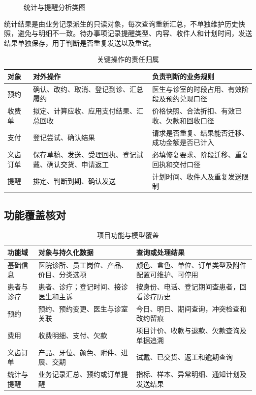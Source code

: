 \begin{figure}[H]\centering
{}
\caption{统计与提醒分析类图}\label{fig:analysis-statistics}
\end{figure}

统计结果是由业务记录派生的只读对象，每次查询重新汇总，不单独维护历史快照，避免与明细不一致。待办事项记录提醒类型、内容、收件人和计划时间，发送结果单独保存，用于判断是否重复发送以及重试。

\begin{table}[H]\centering\caption{关键操作的责任归属}
\small
\begin{tabularx}{\textwidth}{L{3.0cm}L{4.4cm}Y}
\toprule
对象 & 对外操作 & 负责判断的业务规则\\\midrule
预约 & 确认、改约、取消、登记到诊、汇总履约 & 医生与诊室的时段占用、有效阶段及预约兑现口径\\
收费单 & 拟定、计算应收、应用支付结果、汇总回收 & 价格快照、合法折扣、有效已收、欠款和回收口径\\
支付 & 登记尝试、确认结果 & 请求是否重复、结果能否迁移、成功金额是否已计入\\
义齿订单 & 保存草稿、发送、受理回执、登记试戴、确认交货、申请返工 & 必填修复要求、阶段迁移、重复回执和交付口径\\
提醒 & 排定、判断到期、确认发送 & 计划时间、收件人及重复发送限制\\
\bottomrule\end{tabularx}
\end{table}

\subsection{功能覆盖核对}
\begin{table}[H]\centering\caption{项目功能与模型覆盖}
\small\begin{tabularx}{\textwidth}{L{2.6cm}L{6.1cm}Y}
\toprule 功能域 & 对象与持久化数据 & 查询或处理结果\\\midrule
基础信息 & 医院诊所、员工岗位、产品、价目、分类选项 & 颜色、盒色、单位、订单类型及附件配置可维护、可停用\\
患者与诊疗 & 患者、诊疗；登记时间、接诊医生和主诉 & 按身份、电话、登记期间查患者，回看诊疗历史\\
预约 & 预约、预约变更、医生与诊室关联 & 今日、明日、期间查询，冲突检查和改约留痕\\
费用 & 收费明细、支付、欠款 & 项目计价、收款与退款、欠款查询及单据追溯\\
义齿订单 & 产品、牙位、颜色、附件、进展、交期 & 试戴、已交货、返工和逾期查询\\
统计与提醒 & 业务记录汇总、预约或订单提醒 & 指标、样本、异常明细、通知计划及发送结果\\
\bottomrule\end{tabularx}\end{table}

